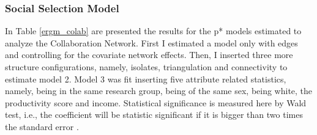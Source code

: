 \documentclass[12pt, english]{article}
\begin{document}
\subsubsection{Social Selection Model}

In Table \ref{ergm_colab} are presented the results for the p* models estimated to analyze the Collaboration Network. First I estimated a model only with edges and controlling for the covariate network effects. Then, I inserted three more structure configurations, namely, isolates, triangulation and connectivity to estimate model 2. Model 3 was fit inserting five attribute related statistics, namely, being in the same research group, being of the same sex, being white, the productivity score and income. Statistical significance is measured here by Wald test, i.e., the coefficient will be statistic significant if it is bigger than two times the standard error \cite{lusher2013exponential,lazega2014redes}.
\end{document}
